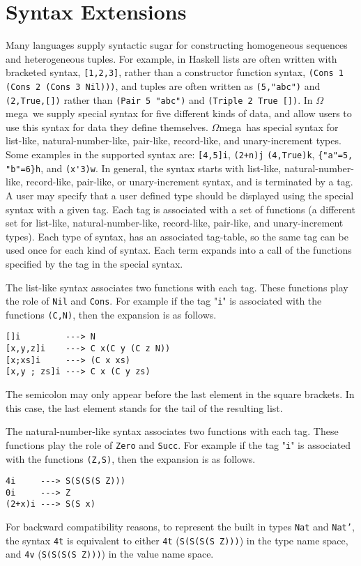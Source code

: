 \documentclass[11pt,twoside]{article}
\newcommand{\om}{$\Omega$mega}
\begin{document}
\section{Syntax Extensions} \label{synext}

Many languages supply syntactic sugar for constructing homogeneous sequences and
heterogeneous tuples. For example, in Haskell lists are often
written with bracketed syntax, \verb+[1,2,3]+, rather than a constructor function syntax, \verb+(Cons 1 (Cons 2 (Cons 3 Nil)))+, and
tuples are often written as \verb+(5,"abc")+ and \verb+(2,True,[])+
rather than \verb+(Pair 5 "abc")+ and \verb+(Triple 2 True [])+. In \om\
we supply special syntax for five different kinds of data, and allow users to
use this syntax for data they define themselves. \om\ has
special syntax for list-like, natural-number-like, pair-like, record-like, and unary-increment types.
Some examples in the supported syntax are: \verb+[4,5]i+, \verb|(2+n)j|
\verb+(4,True)k+, \verb+{"a"=5, "b"=6}h+, and \verb+(x'3)w+. In general, the syntax starts 
with list-like, natural-number-like, record-like, pair-like, or unary-increment syntax,
and is terminated by a tag. A user may specify that 
a user defined type should be displayed using the special syntax with a given tag. Each
tag is associated with a set of functions (a different set for
list-like, natural-number-like, record-like, pair-like, and unary-increment types). 
Each type of syntax, has an associated tag-table, so the same tag can be used once for
each kind of syntax. Each
term expands into a call of the functions specified by the tag
in the special syntax.

The list-like syntax associates two functions with each
tag. These functions play the role of {\tt Nil} and {\tt Cons}.
For example if the tag "{\tt i}" is associated with
the functions {\tt (C,N)}, then the expansion is as follows.
\begin{verbatim}
[]i         ---> N
[x,y,z]i    ---> C x(C y (C z N))
[x;xs]i     ---> (C x xs)
[x,y ; zs]i ---> C x (C y zs)
\end{verbatim}
\noindent
The semicolon may only appear before the last element in the square brackets.
In this case, the last element stands for the tail of the resulting list.

The natural-number-like syntax associates two functions with each
tag. These functions play the role of {\tt Zero} and {\tt Succ}.
For example if the tag "{\tt i}" is associated with
the functions {\tt (Z,S)}, then the expansion is as follows.
\begin{verbatim}
4i     ---> S(S(S(S Z)))
0i     ---> Z
(2+x)i ---> S(S x)
\end{verbatim}
For backward compatibility reasons, to represent the
built in types {\tt Nat} and {\tt Nat'}, the syntax \verb+4t+ is equivalent
to either \verb+4t+ ({\tt  S(S(S(S Z)))}) in the type name space, and \verb+4v+ 
({\tt  S(S(S(S Z)))}) in the value name space.
\end{document}
